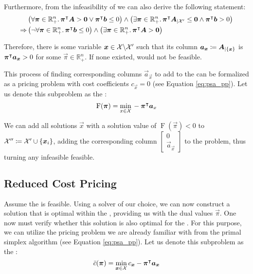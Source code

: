 Furthermore, from the infeasibility of \RMP{} we can also derive the following statement:
\begin{equation}
\begin{aligned}
& \left( \forall {\bm{\pi}} \in \mathbb{R}_+^n. \, {\bm{\pi}}^\intercal {\bm{A}} > {\bm{0}} \lor {\bm{\pi}}^\intercal {\bm{b}} \leq 0 \right) \land \left( \exists {\bm{\pi}} \in \mathbb{R}_+^n. \, {\bm{\pi}}^\intercal {\bm{A}}_{\vert \mathcal{X}'} \leq {\bm{0}} \land {\bm{\pi}}^\intercal {\bm{b}} > 0 \right) \\
\Rightarrow & \left( \neg \forall {\bm{\pi}} \in \mathbb{R}_+^n. \, {\bm{\pi}}^\intercal {\bm{b}} \leq 0 \right) \land \left( \exists {\bm{\pi}} \in \mathbb{R}_+^n. \, {\bm{\pi}}^\intercal {\bm{A}} > {\bm{0}} \right)
\end{aligned}
\end{equation}

Therefore, there is some variable ${\bm{x}} \in \mathcal{X} \backslash \mathcal{X}'$ such that its column ${\bm{a}}_{\bm{x}} \coloneqq {\bm{A}}_{\vert \{{\bm{x}}\}}$ is ${\bm{\pi}}^\intercal {\bm{a}}_{\bm{x}} > 0$ for some $\vec{\pi} \in \mathbb{R}_+^n$. If none existed, \MP{} would not be feasible.

This process of finding corresponding columns $\vec{a}_\vec{x}$ to add to the \RMP{} can be formalized as a pricing problem with cost coefficients $c_\vec{x} = 0$ (see Equation \eqref{eq:psa_pp}). Let us denote this subproblem as the \FP{}:
\begin{equation}
\operatorname{F}({\bm{\pi}}) = \underset{x \in \mathcal{X}}{\min} \, -{\bm{\pi}}^\intercal {\bm{a}}_x
\end{equation}

We can add all solutions $\vec{x}$ with a solution value of $\operatorname{F}(\vec{\pi}) < 0$ to $\mathcal{X}'' \coloneqq \mathcal{X}' \cup \{{\bm{x}}_i\}$, adding the corresponding column $\begin{bmatrix}0 \\ \vec{a}_\vec{x} \end{bmatrix}$ to the problem, thus turning any infeasible \RMP{} feasible.

\subsection{Reduced Cost Pricing}\label{sec:cg_bp_cg_reduced}
Assume the \RMP{} is feasible. Using a solver of our choice, we can now construct a solution that is optimal within the \RMP{}, providing us with the dual values $\vec{\pi}$. One now must verify whether this solution is also optimal for the \MP{}. For this purpose, we can utilize the pricing problem we are already familiar with from the primal simplex algorithm (see Equation \eqref{eq:psa_pp}). Let us denote this subproblem as the \RCP{}:
\begin{equation}
\bar{c}(\vec{\pi}) = \underset{\vec{x} \in \indexset{X}}{\min} \, c_\vec{x} - \vec{\pi}\transpose \vec{a}_\vec{x}
\end{equation}

